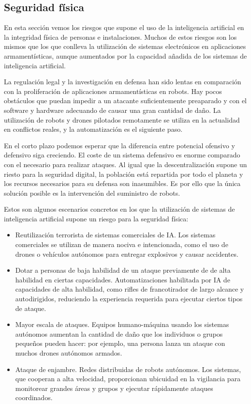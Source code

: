 \documentclass[12pt,a4paper]{article}
\begin{document}
\subsection{Seguridad física}

En esta sección vemos los riesgos que supone el uso de la inteligencia artificial en la integridad física de personas e instalaciones. Muchos de estos riesgos son los mismos que los que conlleva la utilización de sistemas electrónicos en aplicaciones armamentísticas, aunque aumentados por la capacidad añadida de los sistemas de inteligencia artificial.

La regulación legal y la investigación en defensa han sido lentas en comparación con la proliferación de aplicaciones armamentísticas en robots. Hay pocos obstáculos que puedan impedir a un atacante suficientemente preaparado y con el software y hardware adecuando de causar una gran cantidad de daño. La utilización de robots y drones pilotados remotamente se utiliza en la actualidad en conflictos reales, y la automatización es el siguiente paso.

En el corto plazo podemos esperar que la diferencia entre potencial ofensivo y defensivo siga creciendo. El coste de un sistema defensivo es enorme comparado con el necesario para realizar ataques. Al igual que la descentralización supone un riesto para la seguridad digital, la población está repartida por todo el planeta y los recursos necesarios para su defensa son inasumibles. Es por ello que la única solución posible es la intervención del suministro de robots.

Estos son algunos escenarios concretos en los que la utilización de sistemas de inteligencia artificial supone un riesgo para la seguridad física:

\begin{itemize}

\item Reutilización terrorista de sistemas comerciales de IA. Los sistemas comerciales se utilizan de manera nociva e intencionada, como el uso de drones o vehículos autónomos para entregar explosivos y causar accidentes.

\item Dotar a personas de baja habilidad de un ataque previamente de de alta habilidad en ciertas capacidades. Automatizaciones habilitada por IA de capacidades de alta habilidad, como rifles de francotirador de largo alcance y autodirigidos, reduciendo la experiencia requerida para ejecutar ciertos tipos de ataque.

\item Mayor escala de ataques. Equipos humano-máquina usando los sistemas autónomos aumentan la cantidad de daño que los individuos o grupos pequeños pueden hacer: por ejemplo, una persona lanza un ataque con muchos drones autónomos armados.

\item Ataque de enjambre. Redes distribuidas de robots autónomos. Los sistemas, que cooperan a alta velocidad, proporcionan ubicuidad en la vigilancia para monitorear grandes áreas y grupos y ejecutar rápidamente ataques coordinados.

\end {itemize}
\end{document}

